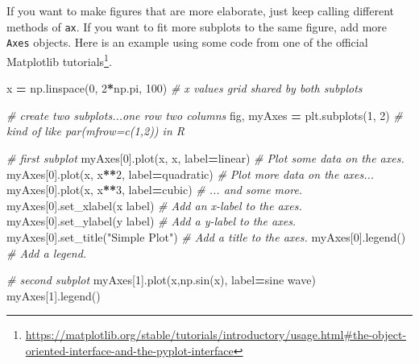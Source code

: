 \documentclass[
  12pt,
  krantz2]{krantz}
\makeatletter
\newenvironment{Shaded}{\begin{snugshade}}{\end{snugshade}}
\newcommand{\CommentTok}[1]{\textcolor[rgb]{0.37,0.37,0.37}{\textit{#1}}}
\newcommand{\DecValTok}[1]{\textcolor[rgb]{0.06,0.06,0.06}{#1}}
\newcommand{\NormalTok}[1]{#1}
\newcommand{\OperatorTok}[1]{\textcolor[rgb]{0.43,0.43,0.43}{\textbf{#1}}}
\newcommand{\StringTok}[1]{\textcolor[rgb]{0.5,0.5,0.5}{#1}}
\renewcommand{\href}[2]{#2\footnote{\url{#1}}}
\newenvironment{kframe}{%
\medskip{}
\setlength{\fboxsep}{.8em}
 \def\at@end@of@kframe{}%
 \ifinner\ifhmode%
  \def\at@end@of@kframe{\end{minipage}}%
  \begin{minipage}{\columnwidth}%
 \fi\fi%
 \def\FrameCommand##1{\hskip\@totalleftmargin \hskip-\fboxsep
 \colorbox{shadecolor}{##1}\hskip-\fboxsep
     \hskip-\linewidth \hskip-\@totalleftmargin \hskip\columnwidth}%
 \MakeFramed {\advance\hsize-\width
   \@totalleftmargin\z@ \linewidth\hsize
   \@setminipage}}%
 {\par\unskip\endMakeFramed%
 \at@end@of@kframe}
\renewenvironment{Shaded}{\begin{kframe}}{\end{kframe}}
\makeatother
\begin{document}
If you want to make figures that are more elaborate, just keep calling different methods of \texttt{ax}. If you want to fit more subplots to the same figure, add more \texttt{Axes} objects. Here is an example using some code from \href{https://matplotlib.org/stable/tutorials/introductory/usage.html\#the-object-oriented-interface-and-the-pyplot-interface}{one of the official Matplotlib tutorials}.

\begin{Shaded}
\begin{Highlighting}[]
\NormalTok{x }\OperatorTok{=}\NormalTok{ np.linspace(}\DecValTok{0}\NormalTok{, }\DecValTok{2}\OperatorTok{*}\NormalTok{np.pi, }\DecValTok{100}\NormalTok{) }\CommentTok{\# x values grid shared by both subplots}

\CommentTok{\# create two subplots...one row two columns}
\NormalTok{fig, myAxes }\OperatorTok{=}\NormalTok{ plt.subplots(}\DecValTok{1}\NormalTok{, }\DecValTok{2}\NormalTok{) }\CommentTok{\# kind of like par(mfrow=c(1,2)) in R}

\CommentTok{\# first subplot}
\NormalTok{myAxes[}\DecValTok{0}\NormalTok{].plot(x, x, label}\OperatorTok{=}\StringTok{\textquotesingle{}linear\textquotesingle{}}\NormalTok{)  }\CommentTok{\# Plot some data on the axes.}
\NormalTok{myAxes[}\DecValTok{0}\NormalTok{].plot(x, x}\OperatorTok{**}\DecValTok{2}\NormalTok{, label}\OperatorTok{=}\StringTok{\textquotesingle{}quadratic\textquotesingle{}}\NormalTok{)  }\CommentTok{\# Plot more data on the axes...}
\NormalTok{myAxes[}\DecValTok{0}\NormalTok{].plot(x, x}\OperatorTok{**}\DecValTok{3}\NormalTok{, label}\OperatorTok{=}\StringTok{\textquotesingle{}cubic\textquotesingle{}}\NormalTok{)  }\CommentTok{\# ... and some more.}
\NormalTok{myAxes[}\DecValTok{0}\NormalTok{].set\_xlabel(}\StringTok{\textquotesingle{}x label\textquotesingle{}}\NormalTok{)  }\CommentTok{\# Add an x{-}label to the axes.}
\NormalTok{myAxes[}\DecValTok{0}\NormalTok{].set\_ylabel(}\StringTok{\textquotesingle{}y label\textquotesingle{}}\NormalTok{)  }\CommentTok{\# Add a y{-}label to the axes.}
\NormalTok{myAxes[}\DecValTok{0}\NormalTok{].set\_title(}\StringTok{"Simple Plot"}\NormalTok{)  }\CommentTok{\# Add a title to the axes.}
\NormalTok{myAxes[}\DecValTok{0}\NormalTok{].legend()  }\CommentTok{\# Add a legend.}

\CommentTok{\# second subplot}
\NormalTok{myAxes[}\DecValTok{1}\NormalTok{].plot(x,np.sin(x), label}\OperatorTok{=}\StringTok{\textquotesingle{}sine wave\textquotesingle{}}\NormalTok{)}
\NormalTok{myAxes[}\DecValTok{1}\NormalTok{].legend()}
\end{Highlighting}
\end{Shaded}
\end{document}
